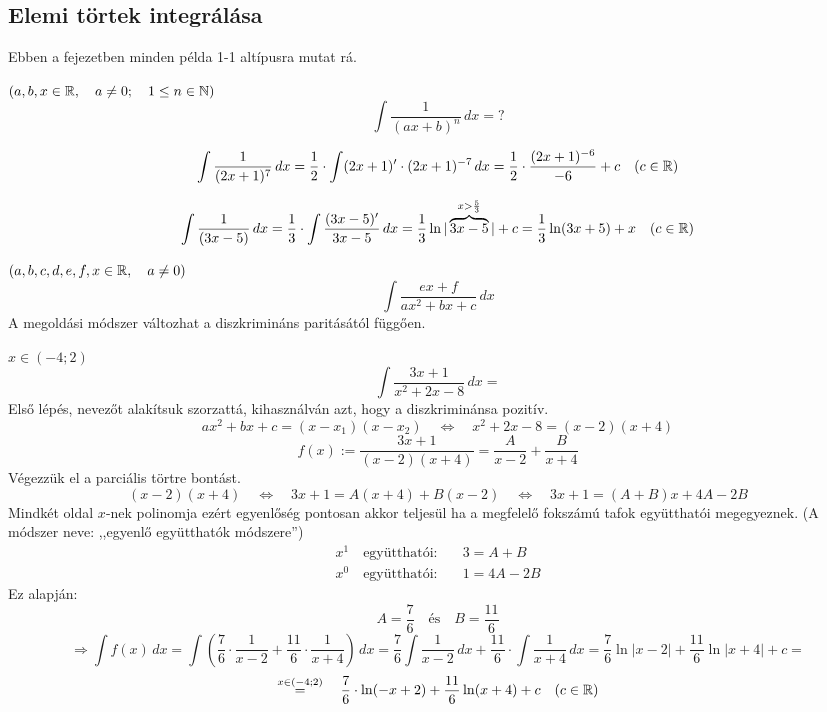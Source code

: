 \documentclass[a4paper,11.5pt]{article}
\begin{document}
	\subsection{Elemi törtek integrálása}
	Ebben a fejezetben minden példa 1-1 altípusra mutat rá.
	\begin{example}
		$(a,b,x\in\mathbb{R},\quad a\not=0;\quad 1\leq n\in\mathbb{N})$
		\[ \int\frac{1}{(ax+b)^n}\,dx=? \]
	\end{example}
	\begin{task}
		\[ \int\frac{1}{(2x+1)^7}\,dx=\frac{1}{2}\cdot\int(2x+1)'\cdot(2x+1)^{-7}\,dx=\frac{1}{2}\cdot\frac{(2x+1)^{-6}}{-6}+c\quad (c\in\mathbb{R}) \]
	\end{task}
	\begin{task}
		\[ \int\frac{1}{(3x-5)}\,dx=\frac{1}{3}\cdot\int\frac{(3x-5)'}{3x-5}\,dx=\frac{1}{3}\ln|\overbrace{3x-5}^{x>\frac{5}{3}}|+c=\frac{1}{3}\ln(3x+5)+x\quad (c\in\mathbb{R}) \]
	\end{task}
	\begin{example}$(a,b,c,d,e,f,x\in\mathbb{R},\quad a\not=0)$
		\[ \int\frac{ex+f}{ax^2+bx+c}\,dx \]
		A megoldási módszer változhat a diszkrimináns paritásától függően.
	\end{example}
	\begin{task}$x\in(-4;2)$
		\[ \int\frac{3x+1}{x^2+2x-8}\,dx= \]
		Első lépés, nevezőt alakítsuk szorzattá, kihasználván azt, hogy a diszkriminánsa pozitív.
		\[ ax^2+bx+c=(x-x_1)(x-x_2)\quad \Leftrightarrow\quad x^2+2x-8=(x-2)(x+4) \]
		\[ f(x):=\frac{3x+1}{(x-2)(x+4)}=\frac{A}{x-2}+\frac{B}{x+4} \]
		Végezzük el a parciális törtre bontást.
		\[ (x-2)(x+4)\quad \Leftrightarrow\quad 3x+1=A(x+4)+B(x-2)\quad \Leftrightarrow\quad 3x+1=(A+B)x+4A-2B \]
		Mindkét oldal $x$-nek polinomja ezért egyenlőség pontosan akkor teljesül ha a megfelelő fokszámú tafok együtthatói megegyeznek. (A módszer neve: ,,egyenlő együtthatók módszere'')
		\begin{align*}
			x^1\quad  \text{együtthatói:}& \quad 3=A+B\\
			x^0\quad  \text{együtthatói:}& \quad 1=4A-2B
		\end{align*}
		Ez alapján:
		\[ A=\frac{7}{6}\quad \text{és}\quad B=\frac{11}{6} \]
		\[ \Rightarrow\int f(x)\,dx=\int\left(\frac{7}{6}\cdot\frac{1}{x-2}+\frac{11}{6}\cdot\frac{1}{x+4}\right)\,dx=\frac{7}{6}\int\frac{1}{x-2}\,dx+\frac{11}{6}\cdot\int\frac{1}{x+4}\,dx=\frac{7}{6}\ln|x-2|+\frac{11}{6}\ln|x+4|+c=\]
		\[\overset{x\in(-4;2)}{=}\quad \frac{7}{6}\cdot\ln(-x+2)+\frac{11}{6}\ln(x+4)+c\quad (c\in\mathbb{R}) \]
	\end{task}
\end{document}
